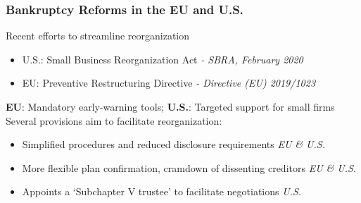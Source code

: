 \documentclass[aspectratio=169,xcolor=table]{beamer}
\begin{document}
\begin{frame}[label=EUandUS]  \frametitle{Bankruptcy Reforms in the EU and U.S. \hfill \hyperlink{sbra_emp}{} \hyperlink{SBRA}{}  }

Recent efforts to streamline reorganization
\begin{itemize} \small
    \item U.S.: Small Business Reorganization Act \hspace{11mm }\textit{- SBRA, February 2020} 
    \item EU: Preventive Restructuring Directive \hspace{12.32mm} \textit{- Directive (EU) 2019/1023}
\end{itemize} \normalsize 
\textbf{EU}: Mandatory early-warning tools; \quad \textbf{U.S.}: Targeted support for small firms  \vspace{5mm} \\

Several provisions aim to facilitate reorganization:
\begin{itemize} \small
    \item Simplified procedures and reduced disclosure requirements \hfill \textit{EU \& U.S.}
    \item More flexible plan confirmation, cramdown of dissenting creditors \hfill \textit{EU \& U.S.}
    \item Appoints a `Subchapter V trustee' to facilitate negotiations \hfill \textit{U.S.} 
\end{itemize} \normalsize

\end{frame}
\end{document}
